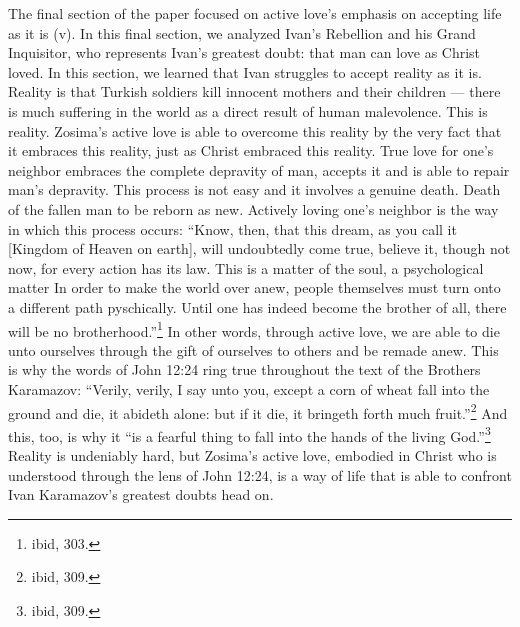 The final section of the paper focused on active love's emphasis on accepting life as it is (v). In this final section, we analyzed Ivan's Rebellion and his Grand Inquisitor, who represents Ivan's greatest doubt: that man can love as Christ loved. In this section, we learned that Ivan struggles to accept reality as it is. Reality is that Turkish soldiers kill innocent mothers and their children --- there is much suffering in the world as a direct result of human malevolence. This is reality. Zosima's active love is able to overcome this reality by the very fact that it embraces this reality, just as Christ embraced this reality. True love for one's neighbor embraces the complete depravity of man, accepts it and is able to repair man's depravity. This process is not easy and it involves a genuine death. Death of the fallen man to be reborn as new. Actively loving one's neighbor is the way in which this process occurs: ``Know, then, that this dream, as you call it [Kingdom of Heaven on earth], will undoubtedly come true, believe it, though not now, for every action has its law. This is a matter of the soul, a psychological matter In order to make the world over anew, people themselves must turn onto a different path pyschically. Until one has indeed become the brother of all, there will be no brotherhood.''\footnote{ibid, 303.} In other words, through active love, we are able to die unto ourselves through the gift of ourselves to others and be remade anew. This is why the words of John 12:24 ring true throughout the text of the Brothers Karamazov: ``Verily, verily, I say unto you, except a corn of wheat fall into the ground and die, it abideth alone: but if it die, it bringeth forth much fruit.''\footnote{ibid, 309.} And this, too, is why it ``is a fearful thing to fall into the hands of the living God.''\footnote{ibid, 309.} Reality is undeniably hard, but Zosima's active love, embodied in Christ who is understood through the lens of John 12:24, is a way of life that is able to confront Ivan Karamazov's greatest doubts head on.

\pagebreak
